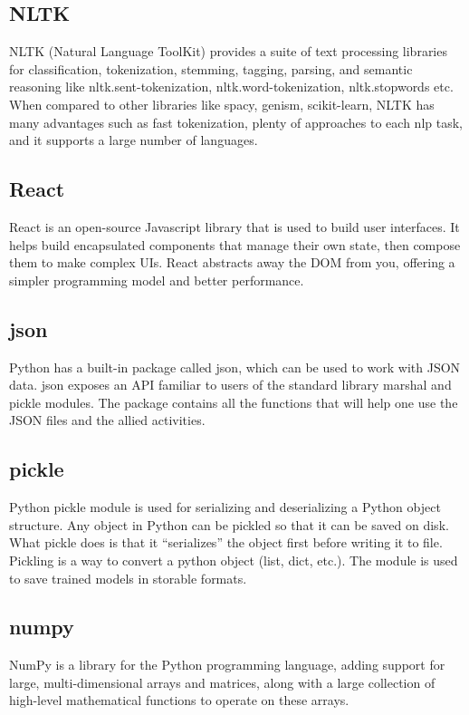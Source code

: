 \documentclass[11pt]{report}
\begin{document}
\subsection{NLTK}
NLTK (Natural Language ToolKit) provides a suite of text processing libraries for classification, tokenization, stemming, tagging, parsing, and semantic reasoning like nltk.sent-tokenization, nltk.word-tokenization, nltk.stopwords etc. When compared to other libraries like spacy, genism, scikit-learn, NLTK has many advantages such as fast tokenization, plenty of approaches to each nlp task, and it supports a large number of languages.

\subsection{React}
React is an open-source Javascript library that is used to build user interfaces. It helps build encapsulated components that manage their own state, then compose them to make complex UIs. React abstracts away the DOM from you, offering a simpler programming model and better performance. 

\subsection{json}
Python has a built-in package called json, which can be used to work with JSON data. json exposes an API familiar to users of the standard library marshal and pickle modules. The package contains all the functions that will help one use the JSON files and the allied activities.

\subsection{pickle}
Python pickle module is used for serializing and deserializing a Python object structure. Any object in Python can be pickled so that it can be saved on disk. What pickle does is that it “serializes” the object first before writing it to file. Pickling is a way to convert a python object (list, dict, etc.). The module is used to save trained models in storable formats.

\subsection{numpy}
NumPy is a library for the Python programming language, adding support for large, multi-dimensional arrays and matrices, along with a large collection of high-level mathematical functions to operate on these arrays.
\end{document}
